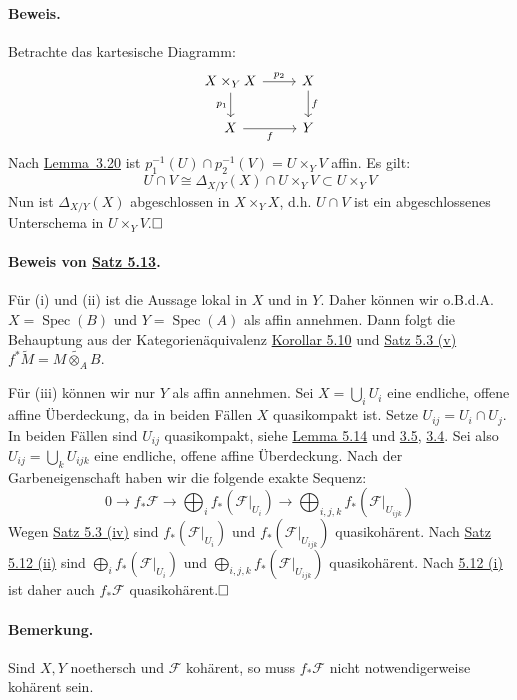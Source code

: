 \documentclass[11pt,b5paper,openany]{memoir}
\def \qed {$\hfill\square$}
\begin{document}
\paragraph{Beweis.} Betrachte das kartesische Diagramm:
\[\begin{tikzcd}
X\times_Y X\ar[r, "p_2"]\ar[d, "p_1"'] & X\ar[d, "f"]\\
X\ar[r, "f"'] & Y
\end{tikzcd} \]
Nach \hyperref[3.20]{Lemma~3.20} ist $p_1^{-1}(U)\cap p_2^{-1}(V)=U\times_YV$ affin. Es gilt: \[U\cap V\cong \Delta_{X/Y}(X)\cap U\times_YV\subset U\times_YV\] Nun ist $\Delta_{X/Y}(X)$ abgeschlossen in $X\times_YX$, d.h. $U\cap V$ ist ein abgeschlossenes Un\-ter\-sche\-ma in $U\times_YV$.\qed

\paragraph{Beweis von \hyperref[5.13]{Satz 5.13}.} Für (i) und (ii) ist die Aussage lokal in $X$ und in $Y$. Daher können wir o.B.d.A. $X=\operatorname{Spec}(B)$ und $Y=\operatorname{Spec}(A)$ als affin annehmen. Dann folgt die Behauptung aus der Kategorienäquivalenz \hyperref[5.10]{Korollar 5.10} und \hyperref[5.3]{Satz 5.3 (v)} $f^\ast\widetilde{M} = \widetilde{M\otimes_AB}$.

Für (iii) können wir nur $Y$ als affin annehmen. Sei $X=\bigcup_i U_i$ eine endliche, offene affine Überdeckung, da in beiden Fällen $X$ quasikompakt ist. Setze $U_{ij}=U_i\cap U_j$. In beiden Fällen sind $U_{ij}$ quasikompakt, siehe \hyperref[5.14]{Lemma 5.14} und \hyperref[3.5]{3.5}, \hyperref[3.4]{3.4}. Sei also $U_{ij}=\bigcup_k U_{ijk}$ eine endliche, offene affine Überdeckung. Nach der Garbeneigenschaft haben wir die folgende exakte Sequenz:
\[0\to f_\ast\mathcal{F} \to\bigoplus_if_\ast(\mathcal{F}|_{U_i}) \to\bigoplus_{i,j,k}f_\ast(\mathcal{F}|_{U_{ijk}}) \]
Wegen \hyperref[5.3]{Satz 5.3 (iv)} sind $f_\ast(\mathcal{F}|_{U_i})$ und $f_\ast(\mathcal{F}|_{U_{ijk}})$ quasikohärent. Nach \hyperref[5.12]{Satz 5.12 (ii)} sind $\bigoplus_i f_\ast(\mathcal{F}|_{U_i})$ und $\bigoplus_{i,j,k}f_\ast(\mathcal{F}|_{U_{ijk}})$ quasikohärent. Nach \hyperref[5.12]{5.12 (i)} ist daher auch $f_\ast\mathcal{F}$ quasikohärent.\qed

\paragraph{Bemerkung.} Sind $X,Y$ noethersch und $\mathcal{F}$  kohärent, so muss $f_\ast\mathcal{F}$ nicht notwendigerweise kohärent sein.
\end{document}
